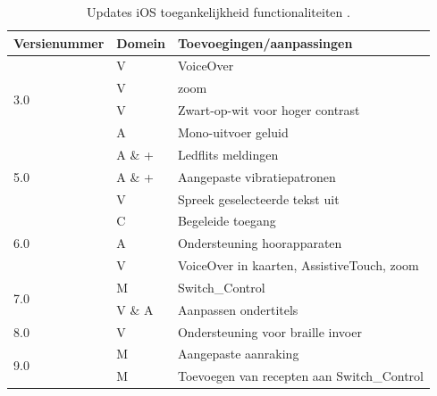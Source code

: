 \begin{table} [h]
        \caption{Updates iOS toegankelijkheid functionaliteiten \autocite{appleReleaseNotes}.}
  \label{iOSUpdates}
       \centering
       \begin{tabular}{|l|l|l|} 
           \hline
           \textbf{Versienummer} & \textbf{Domein} & \textbf{Toevoegingen/aanpassingen}          \\ 
           \hline
           \multirow{4}{*}{3.0}  & V               & \gls{VoiceOver}                    \\ 
           \cline{2-3}
           & V               & \gls{zoom}                                        \\ 
           \cline{2-3}
           & V               & Zwart-op-wit voor hoger contrast            \\ 
           \cline{2-3}
           & A               & Mono-uitvoer geluid            \\ 
           \hline
           \multirow{3}{*}{5.0}  & A   \& +             & Ledflits meldingen                          \\ 
           \cline{2-3}
           & A \& +                & Aangepaste vibratiepatronen                 \\ 
           \cline{2-3}
           & V               & Spreek geselecteerde tekst uit              \\ 
           \hline
           \multirow{3}{*}{6.0}  & C               & \gls{Begeleide toegang}                           \\ 
           \cline{2-3}
           & A               & Ondersteuning hoorapparaten                 \\ 
           \cline{2-3}
           & V               & \gls{VoiceOver} in kaarten, AssistiveTouch, \gls{zoom}  \\ 
           \hline
           \multirow{2}{*}{7.0}  &  M         & \gls{Switch_Control}                             \\ 
           \cline{2-3}
           & V \& A          & Aanpassen ondertitels                       \\ 
           \hline
           8.0                   & V               & Ondersteuning voor braille invoer           \\ 
           \hline
           \multirow{2}{*}{9.0}  & M               & Aangepaste aanraking                         \\ 
           \cline{2-3}
           & M               & Toevoegen van recepten aan \gls{Switch_Control}         \\ 

\end{tabular}
\end{table}
